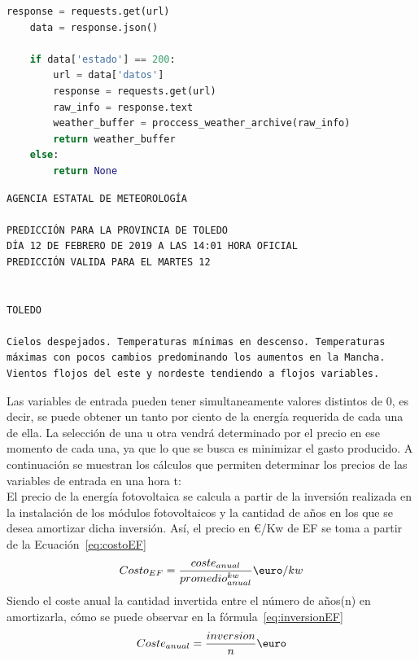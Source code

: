 \begin{itemize}
\begin{lstlisting}[language=Python,float=ht,caption={Función para obtener los valores meteorológicos de un día concreto},label={lst:aemet2}]
    response = requests.get(url)
    data = response.json()

    if data['estado'] == 200:
        url = data['datos']
        response = requests.get(url)
        raw_info = response.text
        weather_buffer = proccess_weather_archive(raw_info)
        return weather_buffer
    else:
        return None
\end{lstlisting}
\begin{lstlisting}[numbers=none,float=ht,caption={Ejemplo de respuesta de la API - AEMET para un día diferente al actual},label={lst:APIresponse2}]
AGENCIA ESTATAL DE METEOROLOGÍA

PREDICCIÓN PARA LA PROVINCIA DE TOLEDO
DÍA 12 DE FEBRERO DE 2019 A LAS 14:01 HORA OFICIAL
PREDICCIÓN VALIDA PARA EL MARTES 12


TOLEDO

Cielos despejados. Temperaturas mínimas en descenso. Temperaturas
máximas con pocos cambios predominando los aumentos en la Mancha.
Vientos flojos del este y nordeste tendiendo a flojos variables.
\end{lstlisting}
\end{itemize}

Las variables de entrada pueden tener simultaneamente valores distintos de 0, es decir, se puede obtener un tanto por ciento de la energía requerida de cada una de ella. La selección de una u otra vendrá determinado por el precio en ese momento de cada una, ya que lo que se busca es minimizar el gasto producido. A continuación se muestran los cálculos que permiten determinar los precios de las variables de entrada en una hora t: \\

	El precio de la energía fotovoltaica se calcula a partir de la inversión realizada en la instalación de los módulos fotovoltaicos y la cantidad de años en los que se desea amortizar dicha inversión. Así, el precio en €/Kw de EF se toma a partir de la Ecuación~\ref{eq:costoEF}
	\begin{equation}
          \label{eq:costoEF}
	Costo_{EF} = \frac{coste_{anual}}{promedio^{kw}_{anual}} \textup{\euro}/kw
	\end{equation}
	Siendo el coste anual la cantidad invertida entre el número de años(n) en amortizarla, cómo se puede observar en la fórmula~\ref{eq:inversionEF}
	\begin{equation}
          \label{eq:inversionEF}
	Coste_{anual} = \frac{inversion}{n} \textup{\euro}
	\end{equation}


